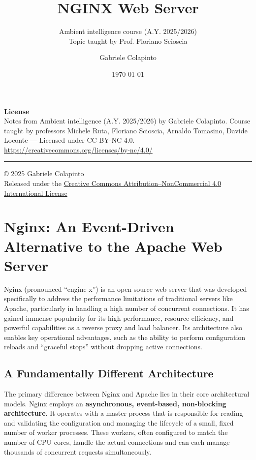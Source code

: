 \documentclass{scrbook}
\title{NGINX Web Server}
\subtitle{Ambient intelligence course (A.Y. 2025/2026)\\Topic taught by Prof. Floriano Scioscia}
\author{Gabriele Colapinto}
\date{\today}
\begin{document}
	
	\maketitle
	\thispagestyle{empty}
	
	{\Large\textbf{License}} \\
	{Notes from Ambient intelligence (A.Y. 2025/2026) by Gabriele Colapinto. 
		Course taught by professors Michele Ruta, Floriano Scioscia, Arnaldo Tomasino, Davide Loconte — 
		Licensed under CC BY-NC 4.0.\\
		\url{https://creativecommons.org/licenses/by-nc/4.0/}}
	
	\vspace*{\fill}
	\rule{\textwidth}{0.2pt}
	\small{© 2025 Gabriele Colapinto \\
		Released under the \href{https://creativecommons.org/licenses/by-nc/4.0/}{Creative Commons Attribution–NonCommercial 4.0 International License}}
	
	\clearpage
	
	\tableofcontents

	\chapter{Nginx: An Event-Driven Alternative to the Apache Web Server}
	
	Nginx (pronounced ``engine-x'') is an open-source web server that was developed specifically to address the performance limitations of traditional servers like Apache, particularly in handling a high number of concurrent connections. It has gained immense popularity for its high performance, resource efficiency, and powerful capabilities as a reverse proxy and load balancer. Its architecture also enables key operational advantages, such as the ability to perform configuration reloads and ``graceful stops'' without dropping active connections.
	
	\section{A Fundamentally Different Architecture}
	
	The primary difference between Nginx and Apache lies in their core architectural models. Nginx employs an \textbf{asynchronous, event-based, non-blocking architecture}. It operates with a master process that is responsible for reading and validating the configuration and managing the lifecycle of a small, fixed number of worker processes. These workers, often configured to match the number of CPU cores, handle the actual connections and can each manage thousands of concurrent requests simultaneously.\\
	
\end{document}
